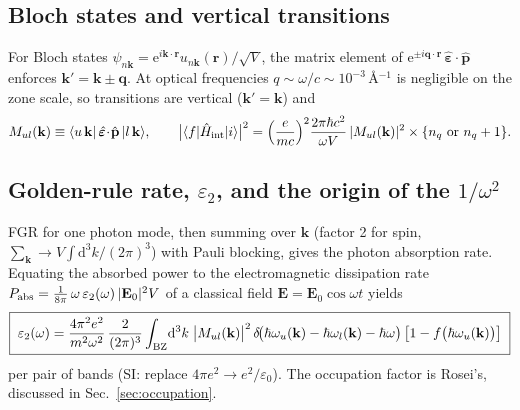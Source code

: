 \documentclass[11pt,a4paper]{article}
\numberwithin{equation}{section}
\begin{document}
\subsection{Bloch states and vertical transitions}

For Bloch states $\psi_{n\mathbf k}={\mathrm{e}}^{i\mathbf k\cdot\mathbf r}
u_{n\mathbf k}(\mathbf r)/\sqrt V$, the matrix element of
${\mathrm{e}}^{\pm i\mathbf q\cdot\mathbf r}\,\hat{\bm{\varepsilon}}\!\cdot\!\hat{\mathbf p}$
enforces $\mathbf k'=\mathbf k\pm\mathbf q$.  At optical frequencies
$q\sim\omega/c\sim10^{-3}\,$\AA$^{-1}$ is negligible on the zone scale,
so transitions are vertical ($\mathbf k'=\mathbf k$) and
\begin{equation}
M_{ul}(\mathbf k)\equiv
\langle u\,\mathbf k|\,\hat{\bm{\varepsilon}}\!\cdot\!\hat{\mathbf p}\,|l\,\mathbf k\rangle,
\qquad
\bigl|\langle f|\hat H_{\rm int}|i\rangle\bigr|^2
=\Bigl(\frac{e}{mc}\Bigr)^{2}\frac{2\pi\hbar c^2}{\omega V}\,
 |M_{ul}(\mathbf k)|^{2}\times\{n_q\text{ or }n_q+1\}.
\label{eq:MEsq}
\end{equation}

\subsection{Golden-rule rate, ${\varepsilon}_2$, and the origin of the $1/\omega^2$}
\label{sec:eps2def}

FGR for one photon mode, then summing over $\mathbf k$ (factor 2 for
spin, $\sum_{\mathbf k}\to V\!\int\!{\mathrm{d}}^3k/(2\pi)^3$) with Pauli
blocking, gives the photon absorption rate.  Equating the absorbed
power to the electromagnetic dissipation rate
$P_{\rm abs}=\tfrac{1}{8\pi}\,\omega\,{\varepsilon}_2(\omega)\,|\mathbf E_0|^2 V$
of a classical field $\mathbf E=\mathbf E_0\cos\omega t$ yields
\begin{equation}
\boxed{\;
{\varepsilon}_2(\omega)=\frac{4\pi^2 e^2}{m^2\omega^2}\,
\frac{2}{(2\pi)^3}\int_{\rm BZ}\!{\mathrm{d}}^3k\;
\bigl|M_{ul}(\mathbf k)\bigr|^{2}\,
\delta\!\bigl(\hbar\omega_u(\mathbf k)-\hbar\omega_l(\mathbf k)-{\hbar\omega}\bigr)\,
\bigl[1-{f}\bigl(\hbar\omega_u(\mathbf k)\bigr)\bigr]\; }
\label{eq:eps2exact}
\end{equation}
per pair of bands (SI: replace $4\pi e^2\to e^2/{\varepsilon}_0$).  The
occupation factor is Rosei's, discussed in Sec.~\ref{sec:occupation}.
\end{document}
